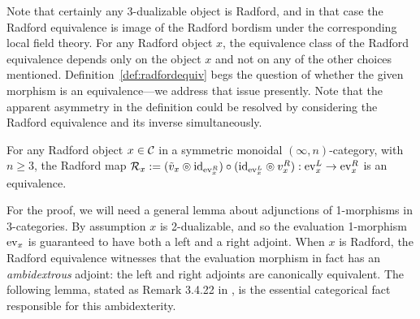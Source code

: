 \documentclass{amsart}
\begin{document}
Note that certainly any 3-dualizable object is Radford, and in that case the Radford equivalence is image of the Radford bordism under the corresponding local field theory.  For any Radford object $x$, the equivalence class of the Radford equivalence depends only on the object $x$ and not on any of the other choices mentioned.  Definition~\ref{def:radfordequiv} begs the question of whether the given morphism is an equivalence---we address that issue presently.  Note that the apparent asymmetry in the definition could be resolved by considering the Radford equivalence and its inverse simultaneously.

\begin{proposition} \label{prop-Cat_Radford}
For any Radford object $x \in \mathcal C$ in a symmetric monoidal $(\infty,n)$-category, with $n \geq 3$, the Radford map $\mathcal R_x := (\tilde{v}_x \circledcirc \mathrm{id}_{\mathrm{ev}_x^R})\circ (\mathrm{id}_{\mathrm{ev}_x^L} \circledcirc v_x^R) : \mathrm{ev}_x^L \rightarrow \mathrm{ev}_x^R$ is an equivalence.
\end{proposition}

For the proof, we will need a general lemma about adjunctions of 1-morphisms in 3-categories.  By assumption $x$ is 2-dualizable, and so the evaluation 1-morphism $\mathrm{ev}_x$ is guaranteed to have both a left and a right adjoint.  When $x$ is Radford, the Radford equivalence witnesses that the evaluation morphism in fact has an \emph{ambidextrous} adjoint: the left and right adjoints are canonically equivalent.  The following lemma, stated as Remark 3.4.22 in \cite{lurie-ch}, is the essential categorical fact responsible for this ambidexterity.
\end{document}
